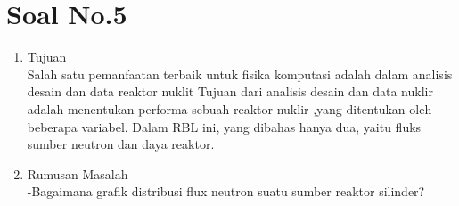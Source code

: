 \documentclass[12pt]{article}
\begin{document}
\section{Soal No.5}
	\begin{enumerate}
		\item Tujuan\\
		Salah satu pemanfaatan terbaik untuk fisika komputasi adalah dalam analisis desain dan data reaktor nuklit
		Tujuan dari analisis desain dan data nuklir adalah menentukan performa sebuah reaktor nuklir ,yang ditentukan oleh beberapa variabel. Dalam RBL ini, yang dibahas hanya dua, yaitu fluks sumber neutron dan daya reaktor.

		\item Rumusan Masalah \\
		-Bagaimana grafik distribusi flux neutron suatu sumber reaktor silinder?
		

\end{enumerate}
\end{document}

